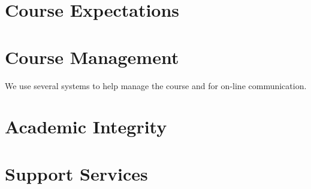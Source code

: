 \documentclass[11pt]{article}
\begin{document}
\section{Course Expectations}



\section{Course Management}

We use several systems to help manage the course
and for on-line communication.





\section{Academic Integrity}



\section{Support Services}



\lastupdated

\end{document}
